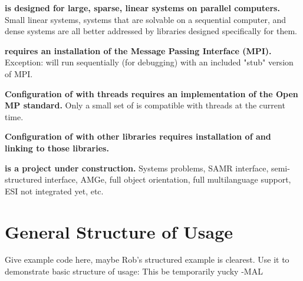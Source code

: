 {\bf \hypre{} is designed for large, sparse, linear systems on parallel
computers.}  Small linear systems, 
systems that are solvable on a sequential computer, and dense systems are all
better addressed by libraries designed specifically for them. 

{\bf \hypre{} requires an installation of the Message Passing Interface (MPI).}
Exception: will run 
sequentially (for debugging) with an included "stub" version of MPI.

{\bf Configuration of \hypre{} with threads
requires an implementation of the Open MP standard.}
Only a small set of \hypre{} is compatible with threads at the current time.

{\bf Configuration of \hypre{} with other libraries requires installation of and
linking to those libraries.}

{\bf \hypre{} is a project under construction.} Systems problems, SAMR interface,
semi-structured interface, 
AMGe, full object orientation, full multilanguage support, ESI not integrated
yet, etc.




\section{General Structure of Usage}

Give example code here, maybe Rob's structured example is clearest. Use it to
demonstrate basic structure of usage:  This be temporarily yucky -MAL

